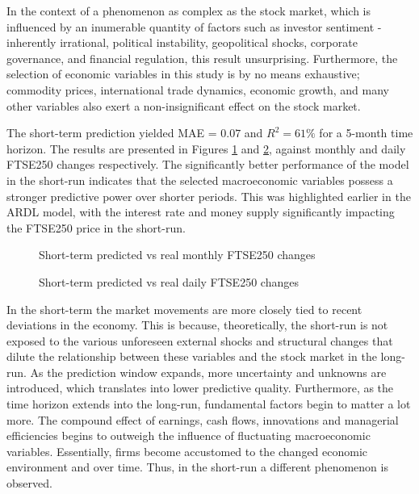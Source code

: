 \documentclass[11pt,a4paper]{article}
\begin{document}
In the context of a phenomenon as complex as the stock market,
which is influenced by an inumerable quantity of factors such as investor sentiment
- inherently irrational, 
political instability, geopolitical shocks, corporate governance, and financial regulation, this result 
unsurprising. Furthermore, the selection of economic variables in this study
is by no means exhaustive; commodity prices, international trade dynamics,
economic growth, and many other variables also exert a non-insignificant 
effect on the stock market.



The short-term prediction yielded MAE = $0.07$ and 
$R^2 = 61\%$ for a 5-month time horizon. The results are presented in Figures \ref{fig:shortmonthly} 
and \ref{fig:shortdaily}, against monthly and daily FTSE250 changes respectively.
The significantly better performance of the model in the short-run
indicates that the selected macroeconomic variables possess
a stronger predictive power over shorter periods. This was highlighted 
earlier in the ARDL model, with the interest rate and money supply significantly
impacting the FTSE250 price in the short-run.



\begin{figure}[H]
    \centering
      
    \caption{Short-term predicted vs real monthly FTSE250 changes}
    \label{fig:shortmonthly}
\end{figure}


\begin{figure}[h!]
    \centering
      
    \caption{Short-term predicted vs real daily FTSE250 changes}
    \label{fig:shortdaily}
\end{figure}


In the short-term the market movements
are more closely tied to recent deviations in the economy. This is because,
theoretically, 
the short-run is not exposed to the various unforeseen external shocks and structural changes
that dilute the relationship between these variables and the stock market in the 
long-run. As the prediction window expands, 
more uncertainty and unknowns are introduced, which translates into 
lower predictive quality. Furthermore, as the time horizon extends into the long-run, fundamental factors 
begin to matter a lot more. The compound effect of earnings, cash flows,
innovations and managerial efficiencies begins to outweigh the 
influence of fluctuating macroeconomic variables. Essentially, firms become accustomed 
to the changed economic environment and over time. Thus, in the short-run 
a different phenomenon is observed.
\end{document}
